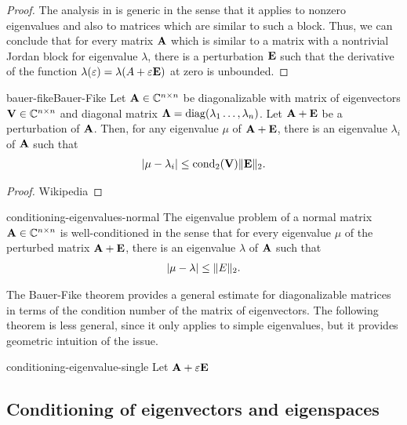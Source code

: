 \begin{proof}
  The analysis in  is
  generic in the sense that it applies to nonzero eigenvalues and also
  to matrices which are similar to such a block. Thus, we can conclude
  that for every matrix $\mathbf A$ which is similar to a matrix with a
  nontrivial Jordan block for eigenvalue $\lambda$, there is a
  perturbation $\mathbf E$ such that the derivative of the function
  $\lambda(\varepsilon) = \lambda(A+\varepsilon\mathbf E)$ at zero is unbounded.
\end{proof}

\begin{Theorem*}{bauer-fike}{Bauer-Fike}
  Let $\mathbf A\in \mathbb C^{n\times n}$ be diagonalizable with matrix of eigenvectors
  $\mathbf V \in \mathbb C^{n\times n}$ and diagonal matrix
  $\boldsymbol\Lambda = \operatorname{diag}(\lambda_1\dots,\lambda_n)$. Let $\mathbf A+\mathbf E$ be
  a perturbation of $\mathbf A$. Then, for any eigenvalue $\mu$ of
  $\mathbf A+\mathbf E$, there is an eigenvalue $\lambda_i$ of $\mathbf A$ such
  that
  \begin{gather}
    \lvert\mu-\lambda_i\rvert \le \operatorname{cond}_2(\mathbf V) \lVert\mathbf E\rVert_2.
  \end{gather}
\end{Theorem*}

\begin{proof}
  Wikipedia
\end{proof}

\begin{Corollary}{conditioning-eigenvalues-normal}
  The eigenvalue problem of a normal matrix $\mathbf A\in\mathbb C^{n\times n}$ is
  well-conditioned in the sense that for every eigenvalue $\mu$ of the
  perturbed matrix $\mathbf A+\mathbf E$, there is an eigenvalue $\lambda$ of
  $\mathbf A$ such that
  \begin{gather}
    \lvert\mu-\lambda\rvert \le \lVert E\rVert_2.
  \end{gather}
\end{Corollary}

The Bauer-Fike theorem provides a general estimate for diagonalizable
matrices in terms of the condition number of the matrix of
eigenvectors. The following theorem is less general, since it only
applies to simple eigenvalues, but it provides geometric intuition of
the issue.

\begin{Theorem}{conditioning-eigenvalue-single}
  Let $\mathbf A+\varepsilon\mathbf E$
\end{Theorem}

\subsection{Conditioning of eigenvectors and eigenspaces}

